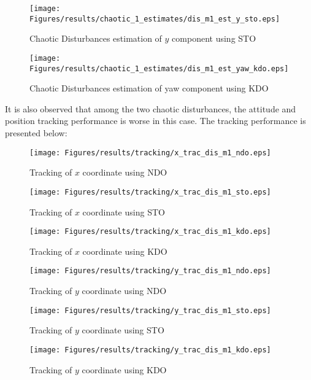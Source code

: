 \documentclass{article}
\begin{document}
\begin{figure}[H]
\centering
\texttt{[image: Figures/results/chaotic\_1\_estimates/dis\_m1\_est\_y\_sto.eps]}
\caption{Chaotic Disturbances estimation of $y$ component using STO}
\label{dis_m1_est_y_sto}
\end{figure}

\begin{figure}[H]
\centering
\texttt{[image: Figures/results/chaotic\_1\_estimates/dis\_m1\_est\_yaw\_kdo.eps]}
\caption{Chaotic Disturbances estimation of yaw component using KDO}
\label{dis_m1_est_yaw_kdo}
\end{figure}

It is also observed that among the two chaotic disturbances, the attitude and position tracking performance is worse in this case. The tracking performance is presented below: 

\begin{figure}[H]
\centering
\texttt{[image: Figures/results/tracking/x\_trac\_dis\_m1\_ndo.eps]}
\caption{Tracking of $x$ coordinate using NDO}
\label{x_trac_dis_m1_ndo}
\end{figure}

\begin{figure}[H]
\centering
\texttt{[image: Figures/results/tracking/x\_trac\_dis\_m1\_sto.eps]}
\caption{Tracking of $x$ coordinate using STO}
\label{x_trac_dis_m1_sto}
\end{figure}

\begin{figure}[H]
\centering
\texttt{[image: Figures/results/tracking/x\_trac\_dis\_m1\_kdo.eps]}
\caption{Tracking of $x$ coordinate using KDO}
\label{x_trac_dis_m1_kdo}
\end{figure}

\begin{figure}[H]
\centering
\texttt{[image: Figures/results/tracking/y\_trac\_dis\_m1\_ndo.eps]}
\caption{Tracking of $y$ coordinate using NDO}
\label{y_trac_dis_m1_ndo}
\end{figure}

\begin{figure}[H]
\centering
\texttt{[image: Figures/results/tracking/y\_trac\_dis\_m1\_sto.eps]}
\caption{Tracking of $y$ coordinate using STO}
\label{y_trac_dis_m1_sto}
\end{figure}

\begin{figure}[H]
\centering
\texttt{[image: Figures/results/tracking/y\_trac\_dis\_m1\_kdo.eps]}
\caption{Tracking of $y$ coordinate using KDO}
\label{y_trac_dis_m1_kdo}
\end{figure}
\end{document}
